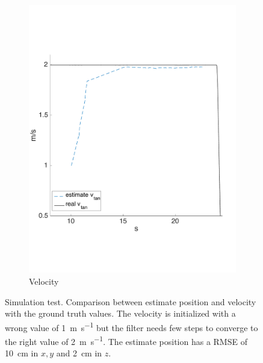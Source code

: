 \begin{figure}[!htbp]
\begin{subfigure}[b]{0.45\textwidth}
        \includegraphics[width=\textwidth]{img/tag_2ms_simulation_vel.pdf}
        \caption{Velocity}
        \label{fig:two_ekf_simulation_2ms}
   \end{subfigure}
  \caption{Simulation test. Comparison between estimate position and velocity with the ground truth values. The velocity is initialized with a wrong value of \SI{1}{\meter \per \second} but the filter needs few steps to converge to the right value of \SI{2}{\meter \per \second}. The estimate position has a RMSE of \SI{10}{\centi \meter} in $x,y$ and \SI{2}{\centi \meter} in $z$.}
  \label{fig:ekf_simulation_2ms}
\end{figure} 




